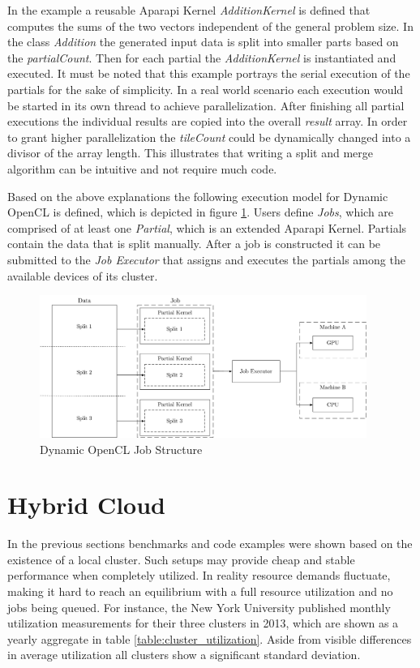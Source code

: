 In the example a reusable Aparapi Kernel \textit{AdditionKernel} is defined that computes the sums of the two vectors independent of the general problem size. In the class \textit{Addition} the generated input data is split into smaller parts based on the \textit{partialCount}. Then for each partial the \textit{AdditionKernel} is instantiated and executed. It must be noted that this example portrays the serial execution of the partials for the sake of simplicity. In a real world scenario each execution would be started in its own thread to achieve parallelization. After finishing all partial executions the individual results are copied into the overall \textit{result} array. In order to grant higher parallelization the \textit{tileCount} could be dynamically changed into a divisor of the array length. This illustrates that writing a split and merge algorithm can be intuitive and not require much code.

Based on the above explanations the following execution model for Dynamic OpenCL is defined, which is depicted in figure \ref{img:dynamic_opencl_job}. Users define \textit{Jobs}, which are comprised of at least one \textit{Partial}, which is an extended Aparapi Kernel. Partials contain the data that is split manually. After a job is constructed it can be submitted to the \textit{Job Executor} that assigns and executes the partials among the available devices of its cluster.

\begin{figure}[H]
	\includegraphics[width=0.95\textwidth]{drawings/dynamic_opencl_job.pdf}
	\centering
	\caption{Dynamic OpenCL Job Structure}
	\label{img:dynamic_opencl_job}
\end{figure}


\section{Hybrid Cloud}
\label{main_hybrid_cloud}
In the previous sections benchmarks and code examples were shown based on the existence of a local cluster. Such setups may provide cheap and stable performance when completely utilized. In reality resource demands fluctuate, making it hard to reach an equilibrium with a full resource utilization and no jobs being queued. For instance, the New York University published monthly utilization measurements for their three clusters in 2013\cite{nyu}, which are shown as a yearly aggregate in table \ref{table:cluster_utilization}. Aside from visible differences in average utilization all clusters show a significant standard deviation.

